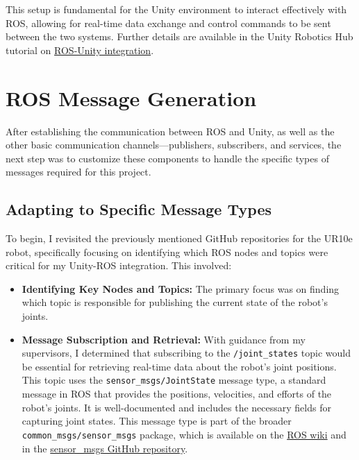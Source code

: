     
    This setup is fundamental for the Unity environment to interact effectively with ROS, allowing for real-time data exchange and control commands to be sent between the two systems. Further details are available in the Unity Robotics Hub tutorial on \href{https://github.com/Unity-Technologies/Unity-Robotics-Hub/blob/main/tutorials/ros_unity_integration/network.md}{ROS-Unity integration}.
    
    \section{ROS Message Generation}
    
    After establishing the communication between ROS and Unity, as well as the other basic communication channels—publishers, subscribers, and services, the next step was to customize these components to handle the specific types of messages required for this project.
    
    \subsection{Adapting to Specific Message Types}
    
    To begin, I revisited the previously mentioned GitHub repositories for the UR10e robot, specifically focusing on identifying which ROS nodes and topics were critical for my Unity-ROS integration. This involved:
    \begin{itemize}
        \item \textbf{Identifying Key Nodes and Topics:} The primary focus was on 
        finding which topic is responsible for publishing the current state of the robot’s joints.
        \item \textbf{Message Subscription and Retrieval:} With guidance from my supervisors, I determined that subscribing to the \texttt{/joint\_states} topic would be essential for retrieving real-time data about the robot's joint positions.  This topic uses the \texttt{sensor\_msgs/JointState} message type, a standard message in ROS that provides the positions, velocities, and efforts of the robot's joints. It is well-documented and includes the necessary fields for capturing joint states. This message type is part of the broader \texttt{common\_msgs/sensor\_msgs} package, which is available on the \href{https://wiki.ros.org/sensor_msgs}{ROS wiki} and in the \href{https://github.com/ros/common_msgs/tree/noetic-devel/sensor_msgs/msg}{sensor\_msgs GitHub repository}.
    \end{itemize}
    
